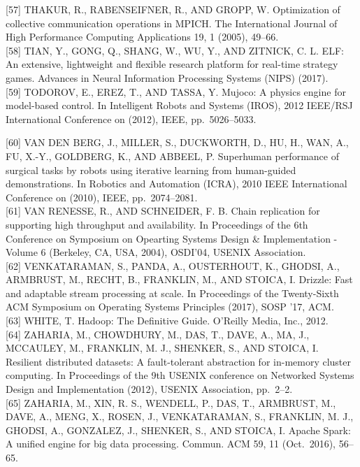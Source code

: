 \documentclass[
]{article}
\begin{document}
{[}57{]} THAKUR, R., RABENSEIFNER, R., AND GROPP, W. Optimization of
collective communication operations in MPICH. The International Journal
of High Performance Computing Applications 19, 1 (2005), 49--66.\\
{[}58{]} TIAN, Y., GONG, Q., SHANG, W., WU, Y., AND ZITNICK, C. L. ELF:
An extensive, lightweight and flexible research platform for real-time
strategy games. Advances in Neural Information Processing Systems (NIPS)
(2017).\\
{[}59{]} TODOROV, E., EREZ, T., AND TASSA, Y. Mujoco: A physics engine
for model-based control. In Intelligent Robots and Systems (IROS), 2012
IEEE/RSJ International Conference on (2012), IEEE, pp.~5026--5033.

{[}60{]} VAN DEN BERG, J., MILLER, S., DUCKWORTH, D., HU, H., WAN, A.,
FU, X.-Y., GOLDBERG, K., AND ABBEEL, P. Superhuman performance of
surgical tasks by robots using iterative learning from human-guided
demonstrations. In Robotics and Automation (ICRA), 2010 IEEE
International Conference on (2010), IEEE, pp.~2074--2081.\\
{[}61{]} VAN RENESSE, R., AND SCHNEIDER, F. B. Chain replication for
supporting high throughput and availability. In Proceedings of the 6th
Conference on Symposium on Opearting Systems Design \& Implementation -
Volume 6 (Berkeley, CA, USA, 2004), OSDI'04, USENIX Association.\\
{[}62{]} VENKATARAMAN, S., PANDA, A., OUSTERHOUT, K., GHODSI, A.,
ARMBRUST, M., RECHT, B., FRANKLIN, M., AND STOICA, I. Drizzle: Fast and
adaptable stream processing at scale. In Proceedings of the Twenty-Sixth
ACM Symposium on Operating Systems Principles (2017), SOSP '17, ACM.\\
{[}63{]} WHITE, T. Hadoop: The Definitive Guide. O'Reilly Media, Inc.,
2012.\\
{[}64{]} ZAHARIA, M., CHOWDHURY, M., DAS, T., DAVE, A., MA, J.,
MCCAULEY, M., FRANKLIN, M. J., SHENKER, S., AND STOICA, I. Resilient
distributed datasets: A fault-tolerant abstraction for in-memory cluster
computing. In Proceedings of the 9th USENIX conference on Networked
Systems Design and Implementation (2012), USENIX Association,
pp.~2--2.\\
{[}65{]} ZAHARIA, M., XIN, R. S., WENDELL, P., DAS, T., ARMBRUST, M.,
DAVE, A., MENG, X., ROSEN, J., VENKATARAMAN, S., FRANKLIN, M. J.,
GHODSI, A., GONZALEZ, J., SHENKER, S., AND STOICA, I. Apache Spark: A
unified engine for big data processing. Commun. ACM 59, 11 (Oct.~2016),
56--65.
\end{document}
